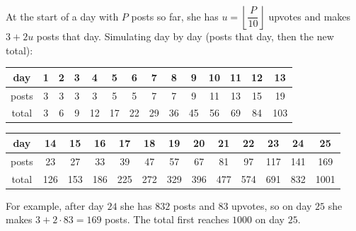 At the start of a day with $P$ posts so far, she has $u=\left\lfloor\dfrac{P}{10}\right\rfloor$ upvotes and makes $3+2u$ posts that day. Simulating day by day (posts that day, then the new total):
\begin{center}
\begin{tabular}{c|ccccccccccccc}
day & 1&2&3&4&5&6&7&8&9&10&11&12&13\\ \hline
posts & 3&3&3&3&5&5&7&7&9&11&13&15&19\\
total & 3&6&9&12&17&22&29&36&45&56&69&84&103
\end{tabular}

\medskip
\begin{tabular}{c|cccccccccccc}
day & 14&15&16&17&18&19&20&21&22&23&24&25\\ \hline
posts & 23&27&33&39&47&57&67&81&97&117&141&169\\
total & 126&153&186&225&272&329&396&477&574&691&832&1001
\end{tabular}
\end{center}
For example, after day $24$ she has $832$ posts and $83$ upvotes, so on day $25$ she makes $3+2\cdot83=169$ posts. The total first reaches $1000$ on day $\boxed{25}$.
